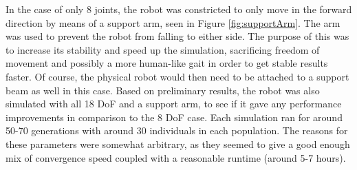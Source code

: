 In the case of only 8 joints, the robot was constricted to only move in the forward direction by means of a support arm, seen in Figure \ref{fig:supportArm}. The arm was used to prevent the robot from falling to either side. The purpose of this was to increase its stability and speed up the simulation, sacrificing freedom of movement and possibly a more human-like gait in order to get stable results faster. Of course, the physical robot would then need to be attached to a support beam as well in this case. Based on preliminary results, the robot was also simulated with all 18 DoF and a support arm, to see if it gave any performance improvements in comparison to the 8 DoF case. Each simulation ran for around 50-70 generations with around 30 individuals in each population. The reasons for these parameters were somewhat arbitrary, as they seemed to give a good enough mix of convergence speed coupled with a reasonable runtime (around 5-7 hours).
